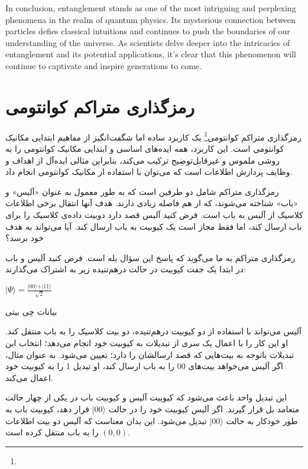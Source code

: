 \documentclass{book}
\begin{document}
In conclusion, entanglement stands as one of the most intriguing and perplexing phenomena in the realm of quantum physics. Its mysterious connection between particles defies classical intuitions and continues to push the boundaries of our understanding of the universe. As scientists delve deeper into the intricacies of entanglement and its potential applications, it's clear that this phenomenon will continue to captivate and inspire generations to come.


\newpage



\section{رمزگذاری متراکم کوانتومی}

رمزگذاری متراکم کوانتومی\footnote{} یک کاربرد ساده اما شگفت‌انگیز از مفاهیم ابتدایی مکانیک کوانتومی است. این کاربرد، همه ایده‌های اساسی و ابتدایی مکانیک کوانتومی را به روشی ملموس و غیرقابل‌توضیح ترکیب می‌کند، بنابراین مثالی ایده‌آل از اهداف و وظایف پردازش اطلاعات است که می‌توان با استفاده از مکانیک کوانتومی انجام داد.

رمزگذاری متراکم شامل دو طرفین است که به طور معمول به عنوان «آلیس» و «باب» شناخته می‌شوند، که از هم فاصله زیادی دارند. هدف آنها انتقال برخی اطلاعات کلاسیک از آلیس به باب است. فرض کنید آلیس قصد دارد دوبیت داده‌ی کلاسیک را برای باب ارسال کند، اما فقط مجاز است یک کیوبیت به باب ارسال کند. آیا می‌تواند به هدف خود برسد؟

رمزگذاری متراکم به ما می‌گوید که پاسخ این سؤال بله است. فرض کنید آلیس و باب در ابتدا یک جفت کیوبیت در حالت درهم‌تنیده زیر به اشتراک می‌گذارند:


\begin{center}
	$\vert \Psi \rangle = \frac{\vert 00 \rangle + \vert 11\rangle}{\sqrt{2}}$
\end{center}


بیانات چی بیتی


آلیس می‌تواند با استفاده از دو کیوبیت درهم‌تنیده، دو بیت کلاسیک را به باب منتقل کند. او این کار را با اعمال یک سری از تبدیلات به کیوبیت خود انجام می‌دهد؛ انتخاب این تبدیلات باتوجه به بیت‌هایی که قصد ارسالشان را دارد؛‌ تعیین می‌شود.  به عنوان مثال، اگر آلیس می‌خواهد بیت‌های 00 را به باب ارسال کند، او تبدیل 1 را به کیوبیت خود اعمال می‌کند.

این تبدیل واحد باعث می‌شود که کیوبیت آلیس و کیوبیت باب در یکی از چهار حالت متعامد بل قرار گیرند. اگر آلیس کیوبیت خود را در حالت $\vert 00 \rangle$ قرار دهد، کیوبیت باب به طور خودکار به حالت $\vert 00 \rangle$ تبدیل می‌شود. این بدان معناست که آلیس دو بیت اطلاعات $(0, 0)$ را به باب منتقل کرده است.
\end{document}
